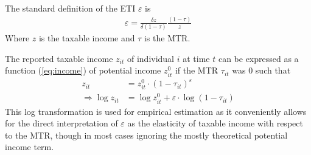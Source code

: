 The standard definition of the ETI $\varepsilon$ is
\begin{align}
  \varepsilon=\frac{\delta z}{\delta(1-\tau)}\frac{(1-\tau)}{z}
  \label{eq:ETI}
\end{align}
Where $z$ is the taxable income and $\tau$ is the MTR.

The reported taxable income $z_{it}$ of individual $i$ at time $t$ can be expressed as a function (\ref{eq:income}) of potential income $z_{it}^0$ if the MTR $\tau_{it}$ was $0$ \citep{gruber2002elasticity} such that
\begin{align}
    z_{it} &= z_{it}^0\cdot(1-\tau_{it})^\varepsilon \nonumber \\
    \Rightarrow \log z_{it} &= \log z_{it}^0 + \varepsilon\cdot\log(1-\tau_{it}) \label{eq:income}
\end{align}
This log transformation is used for empirical estimation as it conveniently allows for the direct interpretation of $\varepsilon$ as the elasticity of taxable income with respect to the MTR, though in most cases ignoring the mostly theoretical potential income term.
